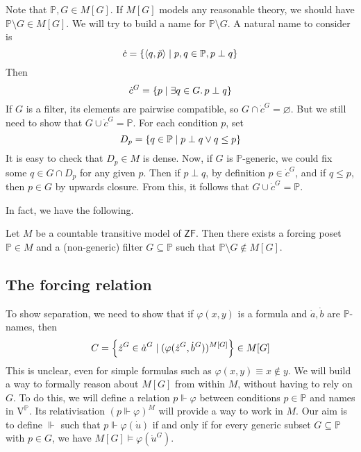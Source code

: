 \begin{example}
    Note that \( \mathbb P, G \in M[G] \).
    If \( M[G] \) models any reasonable theory, we should have \( \mathbb P \setminus G \in M[G] \).
    We will try to build a name for \( \mathbb P \setminus G \).
    A natural name to consider is
    \[ \dot c = \qty{\langle q, \check p \rangle \mid p, q \in \mathbb P, p \perp q} \]
    Then
    \[ \dot c^G = \qty{p \mid \exists q \in G.\, p \perp q} \]
    If \( G \) is a filter, its elements are pairwise compatible, so \( G \cap \dot c^G = \varnothing \).
    But we still need to show that \( G \cup \dot c^G = \mathbb P \).
    For each condition \( p \), set
    \[ D_p = \qty{q \in \mathbb P \mid p \perp q \vee q \leq p} \]
    It is easy to check that \( D_p \in M \) is dense.
    Now, if \( G \) is \( \mathbb P \)-generic, we could fix some \( q \in G \cap D_p \) for any given \( p \).
    Then if \( p \perp q \), by definition \( p \in \dot c^G \), and if \( q \leq p \), then \( p \in G \) by upwards closure.
    From this, it follows that \( G \cup \dot c^G = \mathbb P \).
\end{example}
In fact, we have the following.
\begin{proposition}
    Let \( M \) be a countable transitive model of \( \mathsf{ZF} \).
    Then there exists a forcing poset \( \mathbb P \in M \) and a (non-generic) filter \( G \subseteq \mathbb P \) such that \( \mathbb P \setminus G \notin M[G] \).
\end{proposition}

\subsection{The forcing relation}
To show separation, we need to show that if \( \varphi(x, y) \) is a formula and \( \dot a, \dot b \) are \( \mathbb P \)-names, then
\[ C = \qty{\dot z^G \in \dot a^G \mid (\varphi(\dot z^G, \dot b^G))^{M[G]}} \in M[G] \]
This is unclear, even for simple formulas such as \( \varphi(x, y) \equiv x \notin y \).
We will build a way to formally reason about \( M[G] \) from within \( M \), without having to rely on \( G \).
To do this, we will define a relation \( p \Vdash \varphi \) between conditions \( p \in \mathbb P \) and names in \( \mathrm{V}^{\mathbb P} \).
Its relativisation \( (p \Vdash \varphi)^M \) will provide a way to work in \( M \).
Our aim is to define \( \Vdash \) such that \( p \Vdash \varphi(\dot u) \) if and only if for every generic subset \( G \subseteq \mathbb P \) with \( p \in G \), we have \( M[G] \vDash \varphi(\dot u^G) \).

